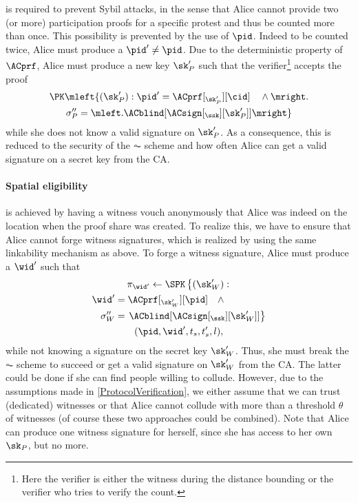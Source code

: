 is required to prevent Sybil attacks, in the sense
that Alice cannot provide two (or more) participation proofs for a
specific protest and thus be counted more than once.
This possibility is prevented by the use of \(\pid\).
Indeed to be counted twice, Alice must produce a \(\pid'\neq \pid\).
Due to the deterministic property of \(\ACprf\), Alice must produce a new key 
\(\sk_P'\) such that the verifier\footnote{%
  Here the verifier is either the witness during the distance bounding or the 
  verifier who tries to verify the count.
} accepts the proof
\begin{multline*}
\PK\mleft\{ (\sk_P') : \pid' = \ACprf[_{\sk_P'}][\cid] \quad \land \mright. \\
    \sigma_P'' = \mleft. \ACblind[\ACsign[_{\ssk}][\sk_P']] \mright\}
\end{multline*}
while she does not know a valid signature on \(\sk_P'\).
As a consequence, this is reduced to the security of the \(\AC\) scheme and how often Alice can get a valid signature on a secret key from the \ac{CA}.

\paragraph{Spatial eligibility}%
\label{analysis-spatial}

 is achieved by having a witness vouch anonymously that Alice was indeed on the location when the proof share was created.
To realize this, we have to ensure that Alice cannot forge witness signatures, which is realized by using the same linkability mechanism as above.
To forge a witness signature, Alice must produce a \(\wid'\) such that
\begin{multline*}
  \pi_{\wid'}\gets \SPK\left\{ (\sk_W') : \right. \\
    \begin{aligned}
      \wid' &= \ACprf[_{\sk_W'}][\pid] \quad \land \\
      \sigma_W'' &= \left. \ACblind[\ACsign[_{\ssk}][\sk_W']] \right\}
    \end{aligned} \\
      (\pid, \wid', t_s, t_s', l),
\end{multline*}
while not knowing a signature on the secret key \(\sk_W'\).
Thus, she must break the \(\AC\) scheme to succeed or get a valid signature on \(\sk_W'\) from the \ac{CA}.
The latter could be done if she can find people willing to collude.
However, due to the assumptions made in \cref{ProtocolVerification}, we either assume that we can trust (dedicated) witnesses or that Alice cannot collude with more than a threshold \(\theta\) of witnesses (of course these two approaches could be combined).
Note that Alice can produce one witness signature for herself, since she has access to her own \(\sk_P\), but no more.

